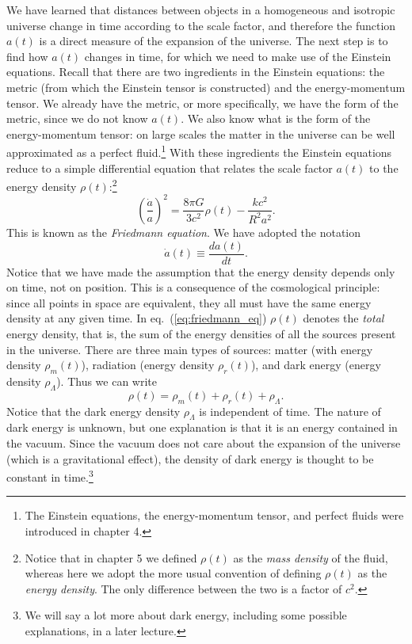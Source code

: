 \documentclass[11pt, a4paper,oneside,openright]{book}
\numberwithin{equation}{section}
\begin{document}
We have learned that distances between objects in a homogeneous and isotropic universe change in time according to the scale factor, and therefore the function $a(t)$ is a direct measure of the expansion of the universe. The next step is to find how $a(t)$ changes in time, for which we need to make use of the Einstein equations. Recall that there are two ingredients in the Einstein equations: the metric (from which the Einstein tensor is constructed) and the energy-momentum tensor. We already have the metric, or more specifically, we have the form of the metric, since we do not know $a(t)$. We also know what is the form of the energy-momentum tensor: on large scales the matter in the universe can be well approximated as a perfect fluid.\footnote{The Einstein equations, the energy-momentum tensor, and perfect fluids were introduced in chapter 4.} With these ingredients the Einstein equations reduce to a simple differential equation that relates the scale factor $a(t)$ to the energy density $\rho(t)$:\footnote{
Notice that in chapter 5 we defined $\rho(t)$ as the {\it mass density} of the fluid, whereas here we adopt the more usual convention of defining $\rho(t)$ as the {\it energy density}. The only difference between the two is a factor of $c^2$.}
\begin{equation} \label{eq:friedmann_eq}
\left(\frac{\dot{a}}{a}\right)^2= \frac{8\pi G}{3c^2}\rho(t)-\frac{kc^2}{R^2a^2}.
\end{equation}
This is known as the {\it Friedmann equation}. We have adopted the notation
\begin{equation}
\dot{a}(t)\equiv \frac{da(t)}{dt}.
\end{equation}
Notice that we have made the assumption that the energy density depends only on time, not on position. This is a consequence of the cosmological principle: since all points in space are equivalent, they all must have the same energy density at any given time. In eq.\ (\ref{eq:friedmann_eq}) $\rho(t)$ denotes the {\it total} energy density, that is, the sum of the energy densities of all the sources present in the universe. There are three main types of sources: matter (with energy density $\rho_m(t)$), radiation (energy density $\rho_r(t)$), and dark energy (energy density $\rho_{\Lambda}$). Thus we can write
\begin{equation}
\rho(t)=\rho_m(t)+\rho_r(t)+\rho_{\Lambda}.
\end{equation}
Notice that the dark energy density $\rho_{\Lambda}$ is independent of time. The nature of dark energy is unknown, but one explanation is that it is an energy contained in the vacuum. Since the vacuum does not care about the expansion of the universe (which is a gravitational effect), the density of dark energy is thought to be constant in time.\footnote{We will say a lot more about dark energy, including some possible explanations, in a later lecture.}
\end{document}
